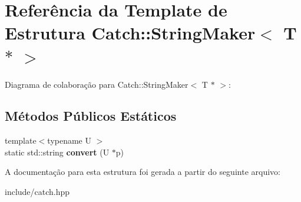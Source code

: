 \hypertarget{structCatch_1_1StringMaker_3_01T_01_5_01_4}{}\section{Referência da Template de Estrutura Catch\+:\+:String\+Maker$<$ T $\ast$ $>$}
\label{structCatch_1_1StringMaker_3_01T_01_5_01_4}


Diagrama de colaboração para Catch\+:\+:String\+Maker$<$ T $\ast$ $>$\+:
\subsection*{Métodos Públicos Estáticos}
\begin{DoxyCompactItemize}
\item 
{\footnotesize template$<$typename U $>$ }\\static std\+::string {\bfseries convert} (U $\ast$p)\hypertarget{structCatch_1_1StringMaker_3_01T_01_5_01_4_a2adbc75c99d71b8323f4052bcb0815c9}{}\label{structCatch_1_1StringMaker_3_01T_01_5_01_4_a2adbc75c99d71b8323f4052bcb0815c9}

\end{DoxyCompactItemize}


A documentação para esta estrutura foi gerada a partir do seguinte arquivo\+:\begin{DoxyCompactItemize}
\item 
include/catch.\+hpp\end{DoxyCompactItemize}
